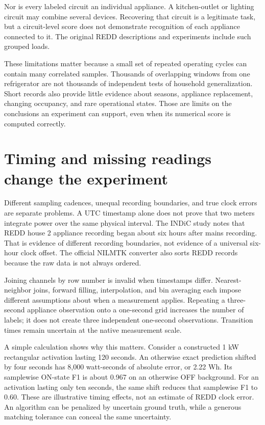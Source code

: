 \documentclass[11pt,letterpaper]{article}
\begin{document}
Nor is every labeled circuit an individual appliance. A kitchen-outlet or lighting circuit may combine several devices. Recovering that circuit is a legitimate task, but a circuit-level score does not demonstrate recognition of each appliance connected to it. The original REDD descriptions and experiments include such grouped loads. \cite{ref1}

These limitations matter because a small set of repeated operating cycles can contain many correlated samples. Thousands of overlapping windows from one refrigerator are not thousands of independent tests of household generalization. Short records also provide little evidence about seasons, appliance replacement, changing occupancy, and rare operational states. Those are limits on the conclusions an experiment can support, even when its numerical score is computed correctly.

\section{Timing and missing readings change the experiment}
Different sampling cadences, unequal recording boundaries, and true clock errors are separate problems. A UTC timestamp alone does not prove that two meters integrate power over the same physical interval. The INDiC study notes that REDD house 2 appliance recording began about six hours after mains recording. That is evidence of different recording boundaries, not evidence of a universal six-hour clock offset. The official NILMTK converter also sorts REDD records because the raw data is not always ordered. \cite{ref3,ref6}

Joining channels by row number is invalid when timestamps differ. Nearest-neighbor joins, forward filling, interpolation, and bin averaging each impose different assumptions about when a measurement applies. Repeating a three-second appliance observation onto a one-second grid increases the number of labels; it does not create three independent one-second observations. Transition times remain uncertain at the native measurement scale.

A simple calculation shows why this matters. Consider a constructed 1 kW rectangular activation lasting 120 seconds. An otherwise exact prediction shifted by four seconds has 8,000 watt-seconds of absolute error, or 2.22 Wh. Its samplewise ON-state F1 is about 0.967 on an otherwise OFF background. For an activation lasting only ten seconds, the same shift reduces that samplewise F1 to 0.60. These are illustrative timing effects, not an estimate of REDD clock error. An algorithm can be penalized by uncertain ground truth, while a generous matching tolerance can conceal the same uncertainty.
\end{document}
